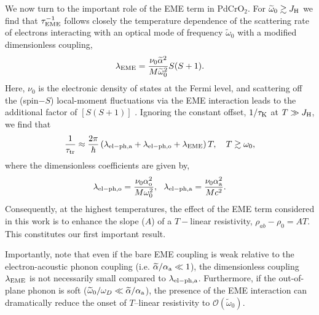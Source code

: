 \documentclass[aps,prl,twocolumn,superscriptaddress,amsmath,nofootinbib,10pt,floatfix]{revtex4-2}
\def \beq {\begin{eqnarray}}
\def \eeq {\end{eqnarray}}
\begin{document}
We now turn to the important role of the EME term in PdCrO$_2$. For $\widetilde{\omega}_0\gtrsim J_{\rm{H}}$  we find that $\tau_{{\rm EME}}^{-1}$ follows closely the temperature dependence of the scattering rate of electrons interacting with an optical mode of frequency $\widetilde{\omega}_0$ with a modified dimensionless coupling, 
 \beq
\lambda_{\rm EME} = \frac{\nu_0 \widetilde{\alpha}^2}{{M}\widetilde{\omega}_0^2}S(S+1).
\label{lambdaeph}
\eeq
Here, $\nu_0$ is the electronic density of states at the Fermi level, and scattering off the (spin$-S$) local-moment fluctuations via the EME interaction leads to the additional factor of $[S(S+1)]$ \cite{Supplementary_material}. Ignoring the constant offset, $1/\tau_{\rm K}$ at $T\gg J_{\rm{H}}$, we find that
\begin{equation}
    \frac{1}{\tau_{\rm tr}} \approx \frac{2\pi}{\hbar}\left(\lambda_{\rm{el-ph, a}} +\lambda_{\rm{el-ph, o}} + \lambda_{\rm EME}\right) T,\quad T\gtrsim \omega_0,
    \label{slope_w_EME}
\end{equation}
where the dimensionless coefficients are given by,
\beq
\lambda_{\rm{el-ph,o}} = \frac{\nu_0\alpha^2_{\rm{o}}}{M\omega_0^2},~~\lambda_{\rm{el-ph,a}} = \frac{\nu_0\alpha^2_{\rm{a}}}{Mc^2}.
\label{lambdaeph}
\eeq
Consequently, at the highest temperatures, the effect of the EME term considered in this work is to enhance the slope ($A$) of a $T-$linear resistivity, $\rho_{ab}-\rho_0=AT$. This constitutes our first important result. 

Importantly, note that even if the bare EME coupling is weak relative to the electron-acoustic phonon coupling (i.e. $\widetilde{\alpha}/ \alpha_{\rm{a}} \ll 1$), the dimensionless coupling $\lambda_{\rm EME}$ is not necessarily small compared to $\lambda_{\rm{el-ph,a}}$. Furthermore, if the out-of-plane phonon %
is soft ($\widetilde{\omega}_0 / \omega_D \ll \widetilde{\alpha}/\alpha_{\rm{a}} $), the presence of the EME interaction can dramatically reduce the onset of $T$--linear resistivity to $\mathcal O(\widetilde{\omega}_0)$. 
\end{document}
